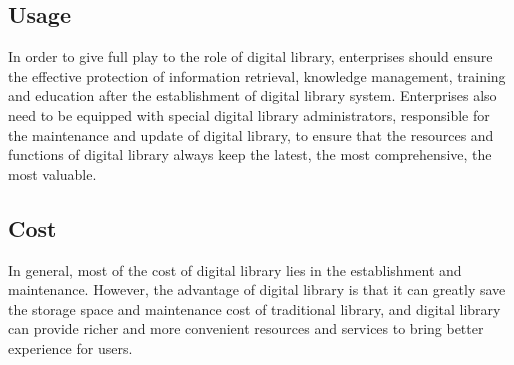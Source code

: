 \subsection{Usage}
In order to give full play to the role of digital library, enterprises should ensure the effective protection of information retrieval, knowledge management, training and education after the establishment of digital library system. Enterprises also need to be equipped with special digital library administrators, responsible for the maintenance and update of digital library, to ensure that the resources and functions of digital library always keep the latest, the most comprehensive, the most valuable.

\subsection{Cost}
In general, most of the cost of digital library lies in the establishment and maintenance. However, the advantage of digital library is that it can greatly save the storage space and maintenance cost of traditional library, and digital library can provide richer and more convenient resources and services to bring better experience for users.
 
